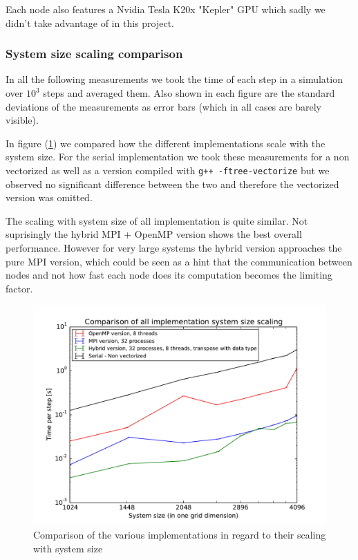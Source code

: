 \documentclass[11pt,a4paper]{article} %
\begin{document}
Each node also features a Nvidia Tesla K20x "Kepler" GPU which sadly we didn't take advantage of in this project.

\subsubsection{System size scaling comparison}

In all the following measurements we took the time of each step in a simulation over $10^{3}$ steps and averaged them. 
Also shown in each figure are the standard deviations of the measurements as error bars (which in all cases are barely visible).

In figure (\ref{fig:system_size_scaling}) we compared how the different implementations scale with the system size.
For the serial implementation we took these measurements for a non vectorized as well as a version compiled with \texttt{g++ -ftree-vectorize} but we observed no significant difference between the two and therefore the vectorized version was omitted.

The scaling with system size of all implementation is quite similar.
Not suprisingly the hybrid MPI + OpenMP version shows the best overall performance.
However for very large systems the hybrid version approaches the pure MPI version, which could be seen as a hint that the communication between nodes and not how fast each node does its computation becomes the limiting factor.

\begin{figure}
\includegraphics[width=\textwidth]{comparison_system_size_scaling.pdf}
\caption{Comparison of the various implementations in regard to their scaling with system size}
\label{fig:system_size_scaling}
\end{figure}
\end{document}
